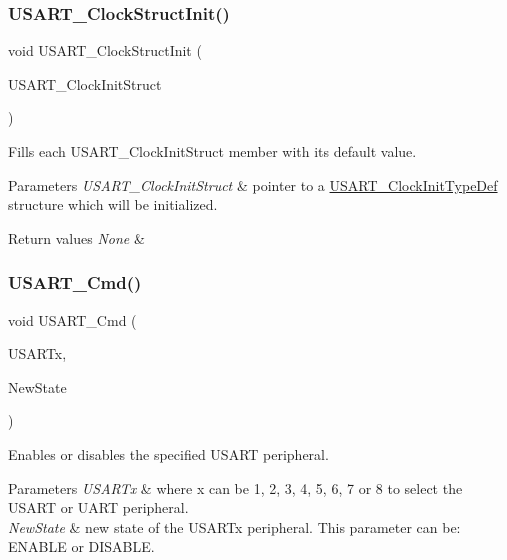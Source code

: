 \subsubsection{\texorpdfstring{U\+S\+A\+R\+T\+\_\+\+Clock\+Struct\+Init()}{USART\_ClockStructInit()}}
{\footnotesize\ttfamily void U\+S\+A\+R\+T\+\_\+\+Clock\+Struct\+Init (\begin{DoxyParamCaption}\item[{\mbox{\hyperlink{struct_u_s_a_r_t___clock_init_type_def}{U\+S\+A\+R\+T\+\_\+\+Clock\+Init\+Type\+Def}} $\ast$}]{U\+S\+A\+R\+T\+\_\+\+Clock\+Init\+Struct }\end{DoxyParamCaption})}



Fills each U\+S\+A\+R\+T\+\_\+\+Clock\+Init\+Struct member with its default value. 


\begin{DoxyParams}{Parameters}
{\em U\+S\+A\+R\+T\+\_\+\+Clock\+Init\+Struct} & pointer to a \mbox{\hyperlink{struct_u_s_a_r_t___clock_init_type_def}{U\+S\+A\+R\+T\+\_\+\+Clock\+Init\+Type\+Def}} structure which will be initialized. \\
\hline
\end{DoxyParams}

\begin{DoxyRetVals}{Return values}
{\em None} & \\
\hline
\end{DoxyRetVals}
\mbox{\label{group___u_s_a_r_t_ga45e51626739c5f22a6567c8a85d1d85e}} 
\subsubsection{\texorpdfstring{U\+S\+A\+R\+T\+\_\+\+Cmd()}{USART\_Cmd()}}
{\footnotesize\ttfamily void U\+S\+A\+R\+T\+\_\+\+Cmd (\begin{DoxyParamCaption}\item[{U\+S\+A\+R\+T\+\_\+\+Type\+Def $\ast$}]{U\+S\+A\+R\+Tx,  }\item[{Functional\+State}]{New\+State }\end{DoxyParamCaption})}



Enables or disables the specified U\+S\+A\+RT peripheral. 


\begin{DoxyParams}{Parameters}
{\em U\+S\+A\+R\+Tx} & where x can be 1, 2, 3, 4, 5, 6, 7 or 8 to select the U\+S\+A\+RT or U\+A\+RT peripheral. \\
\hline
{\em New\+State} & new state of the U\+S\+A\+R\+Tx peripheral. This parameter can be\+: E\+N\+A\+B\+LE or D\+I\+S\+A\+B\+LE. \\
\hline
\end{DoxyParams}

